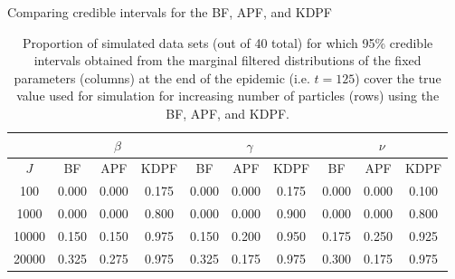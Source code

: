 \begin{table}
\ssp
\centering
\caption{Comparing credible intervals for the BF, APF, and KDPF} \label{tab:epid:pfs}
\begin{tabular}{|c|ccc|ccc|ccc|}
\hline
  & \multicolumn{3}{|c|}{$\beta$} & \multicolumn{3}{|c|}{$\gamma$} & \multicolumn{3}{|c|}{$\nu$} \\
  \hline
  $J$ & BF & APF & KDPF & BF & APF & KDPF & BF & APF & KDPF \\
  \hline
  100 & 0.000 & 0.000 & 0.175 & 0.000 & 0.000 & 0.175 & 0.000 & 0.000 & 0.100 \\
  \hline
  1000 & 0.000 & 0.000 & 0.800 & 0.000 & 0.000 & 0.900 & 0.000 & 0.000 & 0.800 \\
  \hline
  10000 & 0.150 & 0.150 & 0.975 & 0.150 & 0.200 & 0.950 & 0.175 & 0.250 & 0.925 \\
  \hline
  20000 & 0.325 & 0.275 & 0.975 & 0.325 & 0.175 & 0.975 & 0.300 & 0.175 & 0.975 \\
\hline
\end{tabular}
\caption*{Proportion of simulated data sets (out of 40 total) for which 95\% credible intervals obtained from the marginal filtered distributions of the fixed parameters (columns) at the end of the epidemic (i.e. $t = 125$) cover the true value used for simulation for increasing number of particles (rows) using the BF, APF, and KDPF.}
\end{table}

